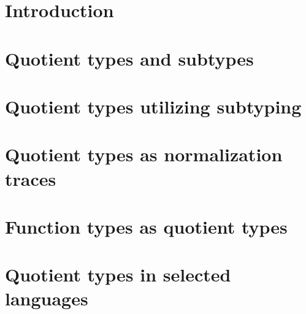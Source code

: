 \documentclass[shortabstract, mgr, english]{iithesis}
\author         {Marek Bauer}
\begin{document}

    \chapter{Introduction}
	
	
    \chapter{Quotient types and subtypes}
	

    \chapter{Quotient types utilizing subtyping}
	

    \chapter{Quotient types as normalization traces}
	

    \chapter{Function types as quotient types}

    \chapter{Quotient types in selected languages}

	
	
\end{document}
